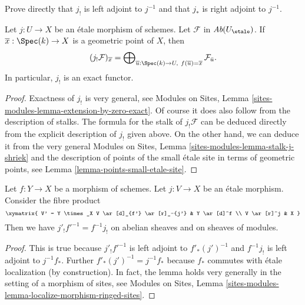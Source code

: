 \begin{exercise}
\label{exercise-jshriek-direct}
Prove directly that $j_!$ is left adjoint to $j^{-1}$ and that $j_*$ is right
adjoint to $j^{-1}$.
\end{exercise}

\begin{proposition}
\label{proposition-describe-jshriek}
Let $j : U \to X$ be an \'etale morphism of schemes.
Let $\mathcal{F}$ in $\textit{Ab}(U_\etale)$.
If $\overline{x} : \Spec(k) \to X$ is a geometric point of $X$, then 
$$
(j_!\mathcal{F})_{\overline{x}} =
\bigoplus\nolimits_{\overline{u} : \Spec(k) \to U,\ f(\overline{u}) =
\overline{x}} \mathcal{F}_{\bar{u}}.
$$
In particular, $j_!$ is an exact functor.
\end{proposition}

\begin{proof}
Exactness of $j_!$ is very general, see Modules on Sites, 
Lemma \ref{sites-modules-lemma-extension-by-zero-exact}.
Of course it does also follow from the description of stalks.
The formula for the stalk of $j_!\mathcal{F}$ can be deduced
directly from the explicit description of $j_!$ given above.
On the other hand, we can deduce it from the very general
Modules on Sites, Lemma \ref{sites-modules-lemma-stalk-j-shriek}
and the description of points of the small \'etale site
in terms of geometric points, see
Lemma \ref{lemma-points-small-etale-site}.
\end{proof}

\begin{lemma}
\label{lemma-shriek-base-change}
Let $f: Y \to X$ be a morphism of schemes. Let $j: V \to X$ be an \'etale
morphism. Consider the fibre product
$$
\xymatrix{
V' = Y \times_X V \ar[d]_{f'} \ar[r]_-{j'} & Y \ar[d]^f \\
V \ar[r]^j & X
}
$$
Then we have $j'_! f'^{-1} = f^{-1} j_!$ on abelian sheaves and on
sheaves of modules.
\end{lemma}

\begin{proof}
This is true because $j'_! f'^{-1}$ is left adjoint to
$f'_* (j')^{-1}$ and $f^{-1} j_!$ is left adjoint to $j^{-1}f_*$.
Further $f'_* (j')^{-1} = j^{-1}f_*$ because $f_*$ commutes with
\'etale localization (by construction). In fact, the lemma holds very generally
in the setting of a morphism of sites, see
Modules on Sites, Lemma
\ref{sites-modules-lemma-localize-morphism-ringed-sites}.
\end{proof}

